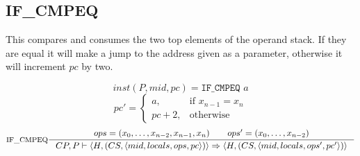 \subsection{IF\_CMPEQ}
This compares and consumes the two top elements of the operand stack.
If they are equal it will make a jump to the address given as a parameter, otherwise it will increment $pc$ by two.

$$inst(P, mid, pc) = \texttt{IF\_CMPEQ }a$$
\[
    pc'= 
\begin{cases}
    a,& \text{if } x_{n-1} = x_n\\
    pc+2,              & \text{otherwise}
\end{cases}
\]
$$\inference[IF\_CMPEQ]{ops=(x_0, \ldots, x_{n-2}, x_{n-1}, x_n) \semsp ops'=(x_0, \ldots, x_{n-2})}
{CP, P \vdash \langle H, (CS, \langle mid, locals, ops, pc \rangle)\rangle \Rightarrow \langle H, (CS, \langle mid, locals, ops', pc' \rangle)\rangle}$$
